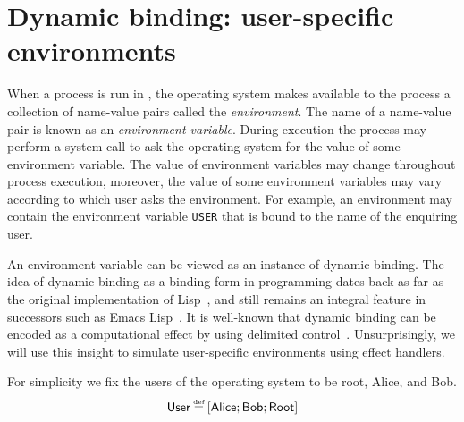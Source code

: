 \documentclass[12pt,phd,lfcs,twoside,openright,logo,leftchapter,normalheadings]{infthesis}
\theoremstyle{plain}
\theoremstyle{definition}
\begin{document}
\section{Dynamic binding: user-specific environments}
\label{sec:tiny-unix-env}

When a process is run in \UNIX{}, the operating system makes available
to the process a collection of name-value pairs called the
\emph{environment}.
%
The name of a name-value pair is known as an \emph{environment
  variable}.
%
During execution the process may perform a system call to ask the
operating system for the value of some environment variable.
%
The value of environment variables may change throughout process
execution, moreover, the value of some environment variables may vary
according to which user asks the environment.
%
For example, an environment may contain the environment variable
\texttt{USER} that is bound to the name of the enquiring user.

An environment variable can be viewed as an instance of dynamic
binding. The idea of dynamic binding as a binding form in programming
dates back as far as the original implementation of
Lisp~\cite{McCarthy60}, and still remains an integral feature in
successors such as Emacs Lisp~\cite{LewisLSG20}. It is well-known that
dynamic binding can be encoded as a computational effect by using
delimited control~\cite{KiselyovSS06}.
%
Unsurprisingly, we will use this insight to simulate user-specific
environments using effect handlers.

For simplicity we fix the users of the operating system to be root,
Alice, and Bob.
%
\[
  \User \defas [\Alice;\Bob;\Root]
\]
\end{document}
